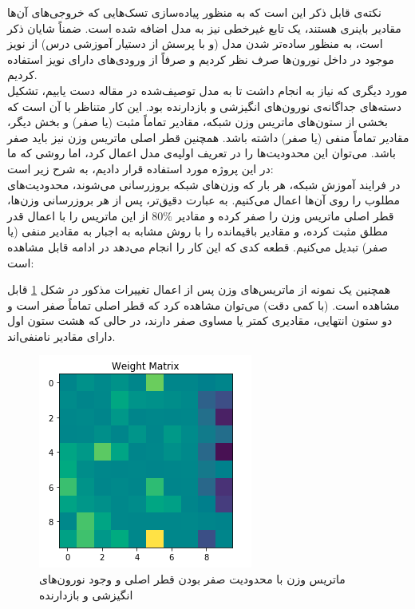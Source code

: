 \documentclass[a4paper]{article}
\begin{document}
نکته‌ی قابل ذکر این است که به منظور پیاده‌سازی تسک‌هایی که خروجی‌های آن‌ها مقادیر باینری هستند، یک تابع غیرخطی 
 نیز به مدل اضافه شده است. ضمناً شایان ذکر است، به منظور ساده‌تر شدن مدل (و با پرسش از دستیار آموزشی درس) از نویز موجود در داخل نورون‌ها صرف نظر کردیم و صرفاً از ورودی‌های دارای نویز استفاده کردیم.\\
 مورد دیگری که نیاز به انجام داشت تا به مدل توصیف‌شده در مقاله دست یابیم، تشکیل دسته‌های جداگانه‌ی نورون‌های انگیزشی و بازدارنده بود. این کار متناظر با آن است که بخشی از ستون‌های ماتریس وزن شبکه، مقادیر تماماً مثبت (یا صفر) و بخش دیگر، مقادیر تماماً منفی (یا صفر) داشته باشد. همچنین قطر اصلی ماتریس وزن نیز باید صفر باشد. می‌توان این محدودیت‌ها را در تعریف اولیه‌ی مدل اعمال کرد، اما روشی که ما در این پروژه مورد استفاده قرار دادیم، به شرح زیر است:\\
 در فرایند آموزش شبکه، هر بار که وزن‌های شبکه بروزرسانی می‌شوند، محدودیت‌های مطلوب را روی آن‌ها اعمال می‌کنیم. به عبارت دقیق‌تر، پس از هر بروزرسانی وزن‌ها، قطر اصلی ماتریس وزن را صفر کرده و مقادیر $80\%$ از این ماتریس را با اعمال قدر مطلق مثبت کرده، و مقادیر باقیمانده را با روش مشابه به اجبار به مقادیر منفی (یا صفر) تبدیل می‌کنیم. قطعه کدی که این کار را انجام می‌دهد در ادامه قابل مشاهده است:
 \begin{normalsize}
 	 \begin{latin}
 		\texttt{}
 	\end{latin}
 \end{normalsize}
 همچنین یک نمونه از ماتریس‌های وزن پس از اعمال تغییرات مذکور در شکل \ref{fig02} قابل مشاهده است. (با کمی دقت) می‌توان مشاهده کرد که قطر اصلی تماماً صفر است و دو ستون انتهایی، مقادیری کمتر یا مساوی صفر دارند، در حالی که هشت ستون اول دارای مقادیر نامنفی‌اند.
 \begin{figure}[h!]
 	\centering
 	\includegraphics[scale=0.7]{fig02.png}
 	\caption{ماتریس وزن با محدودیت‌ صفر بودن قطر اصلی و وجود نورون‌های انگیزشی و بازدارنده}
 	\label{fig02}
 \end{figure}
 
\end{document}

